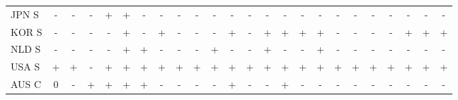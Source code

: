 \documentclass[12pt,bibliography=totoc]{article}
\begin{document}
\begin{appendices}
\begin{table}[H]
\begin{tabular}{l  cccccccc@{\hskip 0.2in}  cccccccc@{\hskip 0.2in}   ccccccc}
JPN S	&\cellcolor{red!25}-	&\cellcolor{red!25}-	&\cellcolor{red!25}-	&\cellcolor{green!25}+	&\cellcolor{green!25}+	&\cellcolor{red!25}-	&\cellcolor{red!25}-	&\cellcolor{red!25}-	&\cellcolor{red!25}-	&\cellcolor{red!25}-	&\cellcolor{red!25}-	&\cellcolor{red!25}-	&\cellcolor{red!25}-	&\cellcolor{red!25}-	&\cellcolor{red!25}-	&\cellcolor{red!25}-	&\cellcolor{red!25}-	&\cellcolor{red!25}-	&\cellcolor{red!25}-	&\cellcolor{red!25}-	&\cellcolor{red!25}-	&\cellcolor{red!25}-	&\cellcolor{red!25}-\\
KOR S	&\cellcolor{red!25}-	&\cellcolor{red!25}-	&\cellcolor{red!25}-	&\cellcolor{red!25}-	&\cellcolor{green!25}+	&\cellcolor{red!25}-	&\cellcolor{green!25}+	&\cellcolor{red!25}-	&\cellcolor{red!25}-	&\cellcolor{red!25}-	&\cellcolor{green!25}+	&\cellcolor{red!25}-	&\cellcolor{green!25}+	&\cellcolor{green!25}+	&\cellcolor{green!25}+	&\cellcolor{green!25}+	&\cellcolor{red!25}-	&\cellcolor{red!25}-	&\cellcolor{red!25}-	&\cellcolor{red!25}-	&\cellcolor{green!25}+	&\cellcolor{green!25}+	&\cellcolor{green!25}+\\
NLD S	&\cellcolor{red!25}-	&\cellcolor{red!25}-	&\cellcolor{red!25}-	&\cellcolor{red!25}-	&\cellcolor{green!25}+	&\cellcolor{green!25}+	&\cellcolor{red!25}-	&\cellcolor{red!25}-	&\cellcolor{red!25}-	&\cellcolor{green!25}+	&\cellcolor{red!25}-	&\cellcolor{red!25}-	&\cellcolor{green!25}+	&\cellcolor{red!25}-	&\cellcolor{red!25}-	&\cellcolor{green!25}+	&\cellcolor{red!25}-	&\cellcolor{red!25}-	&\cellcolor{red!25}-	&\cellcolor{red!25}-	&\cellcolor{red!25}-	&\cellcolor{red!25}-	&\cellcolor{red!25}-\\
USA S	&\cellcolor{green!25}+	&\cellcolor{green!25}+	&\cellcolor{red!25}-	&\cellcolor{green!25}+	&\cellcolor{green!25}+	&\cellcolor{green!25}+	&\cellcolor{green!25}+	&\cellcolor{green!25}+	&\cellcolor{green!25}+	&\cellcolor{green!25}+	&\cellcolor{green!25}+	&\cellcolor{green!25}+	&\cellcolor{green!25}+	&\cellcolor{green!25}+	&\cellcolor{green!25}+	&\cellcolor{green!25}+	&\cellcolor{green!25}+	&\cellcolor{green!25}+	&\cellcolor{green!25}+	&\cellcolor{green!25}+	&\cellcolor{green!25}+	&\cellcolor{green!25}+	&\cellcolor{green!25}+\\
AUS C	&\cellcolor{yellow!25}0	&\cellcolor{red!25}-	&\cellcolor{green!25}+	&\cellcolor{green!25}+	&\cellcolor{green!25}+	&\cellcolor{green!25}+	&\cellcolor{red!25}-	&\cellcolor{red!25}-	&\cellcolor{red!25}-	&\cellcolor{red!25}-	&\cellcolor{green!25}+	&\cellcolor{red!25}-	&\cellcolor{red!25}-	&\cellcolor{green!25}+	&\cellcolor{red!25}-	&\cellcolor{red!25}-	&\cellcolor{red!25}-	&\cellcolor{red!25}-	&\cellcolor{red!25}-	&\cellcolor{red!25}-	&\cellcolor{red!25}-	&\cellcolor{red!25}-	&\cellcolor{red!25}-\\

\end{tabular}
\end{table}
\end{appendices}
\end{document}
